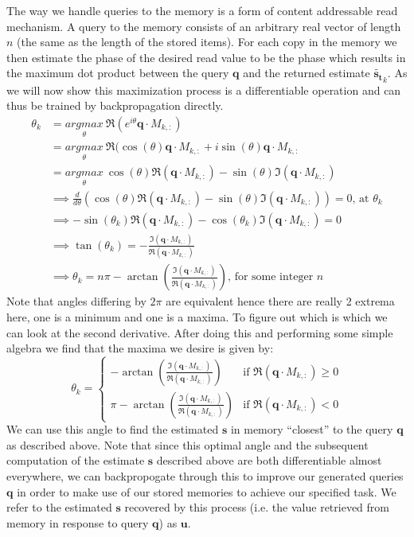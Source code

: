 \documentclass{article}
\begin{document}
The way we handle queries to the memory is a form of content addressable read mechanism. A query to the memory consists of an arbitrary real vector of length $n$ (the same as the length of the stored items). For each copy in the memory we then estimate the phase of the desired read value to be the phase which results in the maximum dot product between the query $\pmb{q}$ and the returned estimate $\tilde{\pmb{s_t}}_{k}$. As we will now show this maximization process is a differentiable operation and can thus be trained by backpropagation directly.
\begin{align*}
\theta_k&=\underset{\theta}{argmax}\  \Re(e^{i\theta}\pmb{q}\cdot M_{k,:})\\
&=\underset{\theta}{argmax}\  \Re(\cos(\theta)\pmb{q}\cdot M_{k,:}+i\sin(\theta)\pmb{q}\cdot M_{k,:}\\
&=\underset{\theta}{argmax}\  \cos(\theta)\Re(\pmb{q}\cdot M_{k,:})-\sin(\theta)\Im(\pmb{q}\cdot M_{k,:})\\
&\implies \frac{d}{d\theta}\left(\cos(\theta)\Re(\pmb{q}\cdot M_{k,:})-\sin(\theta)\Im(\pmb{q}\cdot M_{k,:})\right)=0\text{, at }\theta_k\\
&\implies -\sin(\theta_k)\Re(\pmb{q}\cdot M_{k,:})-\cos(\theta_k)\Im(\pmb{q}\cdot M_{k,:})=0\\
&\implies \tan(\theta_k)=-\frac{\Im(\pmb{q}\cdot M_{k,:})}{\Re(\pmb{q}\cdot M_{k,:})}\\
&\implies \theta_k=n\pi-\arctan\left(\frac{\Im(\pmb{q}\cdot M_{k,:})}{\Re(\pmb{q}\cdot M_{k,:})}\right)\text{, for some integer }n
\end{align*}
Note that angles differing by $2\pi$ are equivalent hence there are really 2 extrema here, one is a minimum and one is a maxima. To figure out which is which we can look at the second derivative. After doing this and performing some simple algebra we find that the maxima we desire is given by:
$$\theta_k = \begin{cases}
 -\arctan\left(\frac{\Im(\pmb{q}\cdot M_{k,:})}{\Re(\pmb{q}\cdot M_{k,:})}\right) &\text{if $\Re(\pmb{q}\cdot M_{k,:})\geq0$}\\    \pi-\arctan\left(\frac{\Im(\pmb{q}\cdot M_{k,:})}{\Re(\pmb{q}\cdot M_{k,:})}\right) &\text{if $\Re(\pmb{q}\cdot M_{k,:})<0$}
\end{cases}
$$
We can use this angle to find the estimated $\pmb{s}$ in memory ``closest'' to the query $\pmb{q}$ as described above. Note that since this optimal angle and the subsequent computation of the estimate $\pmb{s}$ described above are both differentiable almost everywhere, we can backpropogate through this to improve our generated queries $\pmb{q}$ in order to make use of our stored memories to achieve our specified task. We refer to the estimated $\pmb{s}$ recovered by this process (i.e. the value retrieved from memory in response to query $\pmb{q}$) as $\pmb{u}$.
\end{document}
